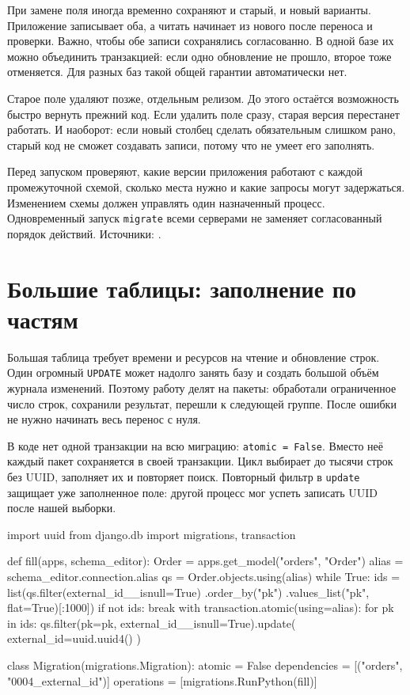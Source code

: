 \documentclass[11pt,a4paper]{article}
\newcommand{\src}[1]{{\small\color{muted}Источники: #1.}}
\newcommand{\parthead}[1]{\Needspace{10\baselineskip}\section{#1}}
\begin{document}
При замене поля иногда временно сохраняют и старый, и новый варианты. Приложение записывает оба, а читать начинает из нового после переноса и проверки. Важно, чтобы обе записи сохранялись согласованно. В одной базе их можно объединить транзакцией: если одно обновление не прошло, второе тоже отменяется. Для разных баз такой общей гарантии автоматически нет.

Старое поле удаляют позже, отдельным релизом. До этого остаётся возможность быстро вернуть прежний код. Если удалить поле сразу, старая версия перестанет работать. И наоборот: если новый столбец сделать обязательным слишком рано, старый код не сможет создавать записи, потому что не умеет его заполнять.

Перед запуском проверяют, какие версии приложения работают с каждой промежуточной схемой, сколько места нужно и какие запросы могут задержаться. Изменением схемы должен управлять один назначенный процесс. Одновременный запуск \texttt{migrate} всеми серверами не заменяет согласованный порядок действий.
\src{\cite{writing,fields,transactions,alembiccookbook}}

\parthead{Большие таблицы: заполнение по частям}

Большая таблица требует времени и ресурсов на чтение и обновление строк. Один огромный \texttt{UPDATE} может надолго занять базу и создать большой объём журнала изменений. Поэтому работу делят на пакеты: обработали ограниченное число строк, сохранили результат, перешли к следующей группе. После ошибки не нужно начинать весь перенос с нуля.

В коде нет одной транзакции на всю миграцию: \texttt{atomic = False}. Вместо неё каждый пакет сохраняется в своей транзакции. Цикл выбирает до тысячи строк без UUID, заполняет их и повторяет поиск. Повторный фильтр в \texttt{update} защищает уже заполненное поле: другой процесс мог успеть записать UUID после нашей выборки.
\begin{code}
import uuid
from django.db import migrations, transaction

def fill(apps, schema_editor):
    Order = apps.get_model("orders", "Order")
    alias = schema_editor.connection.alias
    qs = Order.objects.using(alias)
    while True:
        ids = list(qs.filter(external_id__isnull=True)
                   .order_by("pk")
                   .values_list("pk", flat=True)[:1000])
        if not ids:
            break
        with transaction.atomic(using=alias):
            for pk in ids:
                qs.filter(pk=pk, external_id__isnull=True).update(
                    external_id=uuid.uuid4()
                )

class Migration(migrations.Migration):
    atomic = False
    dependencies = [("orders", "0004_external_id")]
    operations = [migrations.RunPython(fill)]
\end{code}
\end{document}
